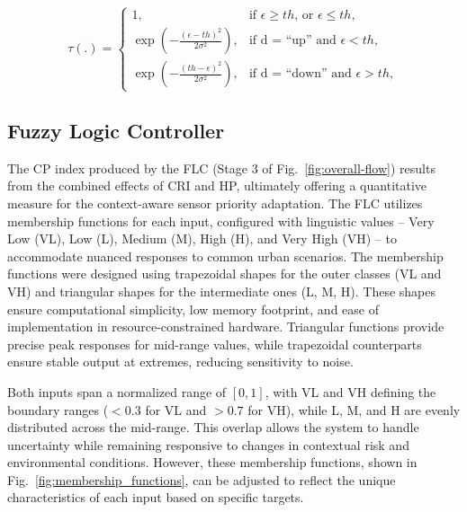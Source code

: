 \documentclass[conference]{IEEEtran}
\begin{document}
\begin{equation}
    \label{eq:tau_func}
    \tau(.) =
    \begin{cases}
        1, & \text{if } \epsilon \geq th \text{, or } \epsilon \leq th, \\
        \exp{\left(-\frac{(\epsilon - th)^2}{2 \sigma^2}\right)}, & \text{if } \text{d = ``up''} \text{ and } \epsilon < th, \\
        \exp{\left(-\frac{(th - \epsilon)^2}{2 \sigma^2}\right)}, & \text{if } \text{d = ``down''}  \text{ and } \epsilon > th,
    \end{cases}
\end{equation}

\subsection{Fuzzy Logic Controller}

The CP index produced by the FLC (Stage 3 of Fig.~\ref{fig:overall-flow}) results from the combined effects of CRI and HP, ultimately offering a quantitative measure for the context-aware sensor priority adaptation. The FLC utilizes membership functions for each input, configured with linguistic values -- Very Low (VL), Low (L), Medium (M), High (H), and Very High (VH) -- to accommodate nuanced responses to common urban scenarios. The membership functions were designed using trapezoidal shapes for the outer classes (VL and VH) and triangular shapes for the intermediate ones (L, M, H). %
These shapes ensure computational simplicity, low memory footprint, and ease of implementation in resource-constrained hardware. Triangular functions provide precise peak responses for mid-range values, while trapezoidal counterparts ensure stable output at extremes, reducing sensitivity to noise. 

Both inputs span a normalized range of \( [0, 1] \), with VL and VH defining the boundary ranges (\( < 0.3 \) for VL and \( > 0.7 \) for VH), while L, M, and H are evenly distributed across the mid-range. This overlap allows the system to handle uncertainty while remaining responsive to changes in contextual risk and environmental conditions. However, these membership functions, shown in Fig.~\ref{fig:membership_functions}, can be adjusted to reflect the unique characteristics of each input based on specific targets.
\end{document}
